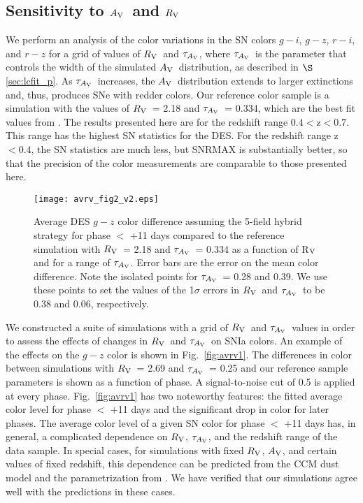 \documentclass[preprint2]{aastex}    %
\newcommand\rv{$R_{\rm V}$}
\newcommand\av{$A_{\rm V}$}
\newcommand\tauav{$\tau_{A_{\rm V}}$}
\begin{document}
\subsection{Sensitivity to \av\ and \rv\ }\label{sec:avrv}
We perform an analysis of the color variations in the SN colors $g-i$,  $g-z$,  $r-i$,
and $r-z$ for a grid of values of  \rv\ and \tauav, 
where \tauav\ is the parameter that controls the width of the 
simulated \av\ distribution, as described in $\S$\ref{sec:lcfit_p}. 
As \tauav\ increases, the \av\ distribution extends
to larger extinctions and, thus, produces SNe with redder colors.
Our reference color sample is a simulation with the 
values of \rv\ = 2.18 and \tauav\ = 0.334, which are the best fit values from \cite{kes09}. 
The results presented here are for the redshift range $0.4<$z$<0.7$. This range has the highest
SN statistics for the DES. For the redshift range z$<0.4$, the SN statistics are 
much less, but SNRMAX is substantially
better, so that the precision of the color measurements are comparable to those
presented here. 

\begin{figure}[ht]
\centerline{\texttt{[image: avrv\_fig2\_v2.eps]}}
\caption{Average DES $g-z$ color difference assuming the 5-field hybrid strategy
 for phase $<$ +11 days compared to the reference 
simulation with \rv\ = 2.18 and \tauav\ = 0.334 as a function of 
R$_{\rm V}$ and for a range of \tauav. Error bars are the 
error on the mean color difference. Note the isolated points for 
\tauav\ = 0.28 and 0.39. We use these points to set the values 
of the 1$\sigma$ errors in \rv\ and \tauav\ to be 0.38 and 0.06, respectively.
}
\label{fig:avrv2}
\end{figure}

We constructed a suite of simulations with a grid of \rv\ and \tauav\ values in order
to assess the effects of changes in \rv\ and \tauav\ on SNIa colors. An example
of the effects on the $g-z$ color is shown in Fig.~\ref{fig:avrv1}.
The differences in color between simulations with \rv\ = 2.69 and \tauav\ = 0.25
and our reference sample parameters is shown as a function of phase.
A signal-to-noise cut of 0.5 is applied at every phase. 
Fig.~\ref{fig:avrv1} has two noteworthy features: the fitted average 
color level for phase $<$ +11 days and the significant drop in color for later phases.
The average color level of a given SN color for phase $<$ +11 days has, in general, a
complicated dependence on \rv, \tauav, and the redshift range of the 
data sample. In special cases, for simulations with fixed \rv, \av, and 
certain values of fixed redshift, this dependence can be predicted from the 
CCM dust model \citep{car89} and the parametrization from \cite{jha07}. 
We have verified that our simulations agree well with the predictions in these cases.   
\end{document}

